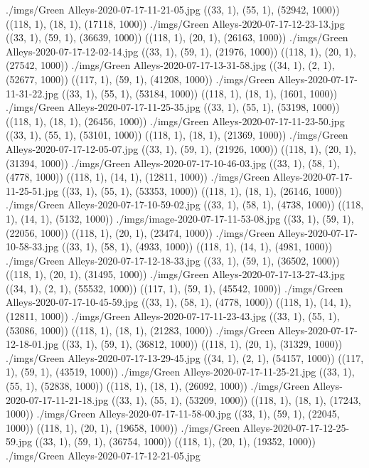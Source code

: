 ./imgs/Green Alleys-2020-07-17-11-21-05.jpg
((33, 1), (55, 1), (52942, 1000))
((118, 1), (18, 1), (17118, 1000))
./imgs/Green Alleys-2020-07-17-12-23-13.jpg
((33, 1), (59, 1), (36639, 1000))
((118, 1), (20, 1), (26163, 1000))
./imgs/Green Alleys-2020-07-17-12-02-14.jpg
((33, 1), (59, 1), (21976, 1000))
((118, 1), (20, 1), (27542, 1000))
./imgs/Green Alleys-2020-07-17-13-31-58.jpg
((34, 1), (2, 1), (52677, 1000))
((117, 1), (59, 1), (41208, 1000))
./imgs/Green Alleys-2020-07-17-11-31-22.jpg
((33, 1), (55, 1), (53184, 1000))
((118, 1), (18, 1), (1601, 1000))
./imgs/Green Alleys-2020-07-17-11-25-35.jpg
((33, 1), (55, 1), (53198, 1000))
((118, 1), (18, 1), (26456, 1000))
./imgs/Green Alleys-2020-07-17-11-23-50.jpg
((33, 1), (55, 1), (53101, 1000))
((118, 1), (18, 1), (21369, 1000))
./imgs/Green Alleys-2020-07-17-12-05-07.jpg
((33, 1), (59, 1), (21926, 1000))
((118, 1), (20, 1), (31394, 1000))
./imgs/Green Alleys-2020-07-17-10-46-03.jpg
((33, 1), (58, 1), (4778, 1000))
((118, 1), (14, 1), (12811, 1000))
./imgs/Green Alleys-2020-07-17-11-25-51.jpg
((33, 1), (55, 1), (53353, 1000))
((118, 1), (18, 1), (26146, 1000))
./imgs/Green Alleys-2020-07-17-10-59-02.jpg
((33, 1), (58, 1), (4738, 1000))
((118, 1), (14, 1), (5132, 1000))
./imgs/image-2020-07-17-11-53-08.jpg
((33, 1), (59, 1), (22056, 1000))
((118, 1), (20, 1), (23474, 1000))
./imgs/Green Alleys-2020-07-17-10-58-33.jpg
((33, 1), (58, 1), (4933, 1000))
((118, 1), (14, 1), (4981, 1000))
./imgs/Green Alleys-2020-07-17-12-18-33.jpg
((33, 1), (59, 1), (36502, 1000))
((118, 1), (20, 1), (31495, 1000))
./imgs/Green Alleys-2020-07-17-13-27-43.jpg
((34, 1), (2, 1), (55532, 1000))
((117, 1), (59, 1), (45542, 1000))
./imgs/Green Alleys-2020-07-17-10-45-59.jpg
((33, 1), (58, 1), (4778, 1000))
((118, 1), (14, 1), (12811, 1000))
./imgs/Green Alleys-2020-07-17-11-23-43.jpg
((33, 1), (55, 1), (53086, 1000))
((118, 1), (18, 1), (21283, 1000))
./imgs/Green Alleys-2020-07-17-12-18-01.jpg
((33, 1), (59, 1), (36812, 1000))
((118, 1), (20, 1), (31329, 1000))
./imgs/Green Alleys-2020-07-17-13-29-45.jpg
((34, 1), (2, 1), (54157, 1000))
((117, 1), (59, 1), (43519, 1000))
./imgs/Green Alleys-2020-07-17-11-25-21.jpg
((33, 1), (55, 1), (52838, 1000))
((118, 1), (18, 1), (26092, 1000))
./imgs/Green Alleys-2020-07-17-11-21-18.jpg
((33, 1), (55, 1), (53209, 1000))
((118, 1), (18, 1), (17243, 1000))
./imgs/Green Alleys-2020-07-17-11-58-00.jpg
((33, 1), (59, 1), (22045, 1000))
((118, 1), (20, 1), (19658, 1000))
./imgs/Green Alleys-2020-07-17-12-25-59.jpg
((33, 1), (59, 1), (36754, 1000))
((118, 1), (20, 1), (19352, 1000))
./imgs/Green Alleys-2020-07-17-12-21-05.jpg
